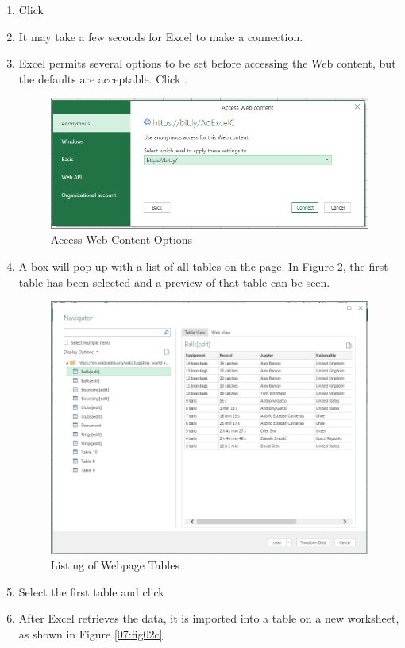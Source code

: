 \begin{enumbox}
\begin{enumerate}
		\item Click 
		\item It may take a few seconds for Excel to make a connection.
		\item Excel permits several options to be set before accessing the Web content, but the defaults are acceptable. Click .

		\begin{figure}[H]
			\centering
			\includegraphics[width=\maxwidth{.95\linewidth}]{gfx/ch07_fig02g}
			\caption{Access Web Content Options}
			\label{07:fig02g}
		\end{figure}
	
		\item A box will pop up with a list of all tables on the page. In Figure \ref{07:fig02b}, the first table has been selected and a preview of that table can be seen.

		\begin{figure}[H]
			\centering
			\includegraphics[width=\maxwidth{.95\linewidth}]{gfx/ch07_fig02b}
			\caption{Listing of Webpage Tables}
			\label{07:fig02b}
		\end{figure}

		\item Select the first table and click 
		\item After Excel retrieves the data, it is imported into a table on a new worksheet, as shown in Figure \ref{07:fig02c}.
	\end{enumerate}
\end{enumbox}

